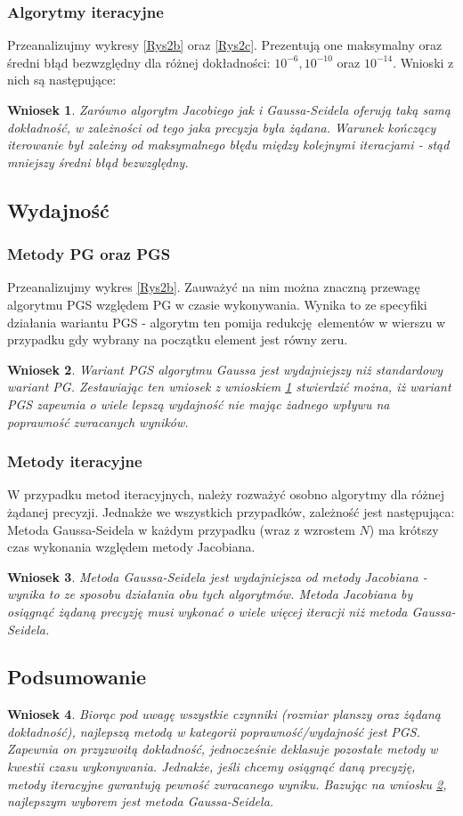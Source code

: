 \documentclass[10pt]{article}
\newtheorem{wn}{Wniosek}
\begin{document}
\subsubsection{Algorytmy iteracyjne}
Przeanalizujmy wykresy \ref{Rys2b} oraz \ref{Rys2c}. Prezentują one maksymalny oraz średni błąd bezwzględny dla różnej dokładności: $10^{-6},10^{-10}$ oraz $10^{-14}$.
Wnioski z nich są następujące:
\begin{wn}
	Zarówno algorytm Jacobiego jak i Gaussa-Seidela oferują taką samą dokładność, w zależności od tego jaka precyzja była żądana. Warunek kończący iterowanie był zależny od maksymalnego błędu między kolejnymi iteracjami - stąd mniejszy średni błąd bezwzględny. \label{wn:3}
\end{wn}
\subsection{Wydajność}
\subsubsection{Metody PG oraz PGS}
Przeanalizujmy wykres \ref{Rys2b}. Zauważyć na nim można znaczną przewagę algorytmu PGS względem PG w czasie wykonywania. Wynika to ze specyfiki działania wariantu PGS - algorytm ten pomija redukcję elementów w wierszu w przypadku gdy wybrany na początku element jest równy zeru.
\begin{wn}
	Wariant PGS algorytmu Gaussa jest wydajniejszy niż standardowy wariant PG. Zestawiając ten wniosek z wnioskiem \ref{wn:3} stwierdzić można, iż wariant PGS zapewnia o wiele lepszą wydajność nie mając żadnego wpływu na poprawność zwracanych wyników.
	 \label{wn:4}
\end{wn}
\subsubsection{Metody iteracyjne}
W przypadku metod iteracyjnych, należy rozważyć osobno algorytmy dla różnej żądanej precyzji.
Jednakże we wszystkich przypadków, zależność jest następująca: Metoda Gaussa-Seidela w każdym przypadku (wraz z wzrostem $N$) ma krótszy czas wykonania względem metody Jacobiana.
\begin{wn}
	Metoda Gaussa-Seidela jest wydajniejsza od metody Jacobiana - wynika to ze sposobu działania obu tych algorytmów. Metoda Jacobiana by osiągnąć żądaną precyzję musi wykonać o wiele więcej iteracji niż metoda Gaussa-Seidela. \label{wn:5}
\end{wn}
\subsection{Podsumowanie}
\begin{wn}
	Biorąc pod uwagę wszystkie czynniki (rozmiar planszy oraz żądaną dokładność), najlepszą metodą w kategorii poprawność/wydajność jest PGS. Zapewnia on przyzwoitą dokładność, jednocześnie deklasuje pozostałe metody w kwestii czasu wykonywania. Jednakże, jeśli chcemy osiągnąć daną precyzję, metody iteracyjne gwrantują pewność zwracanego wyniku. Bazując na wniosku \ref{wn:4}, najlepszym wyborem jest metoda Gaussa-Seidela. \label{wn:6}
\end{wn}
\end{document}
